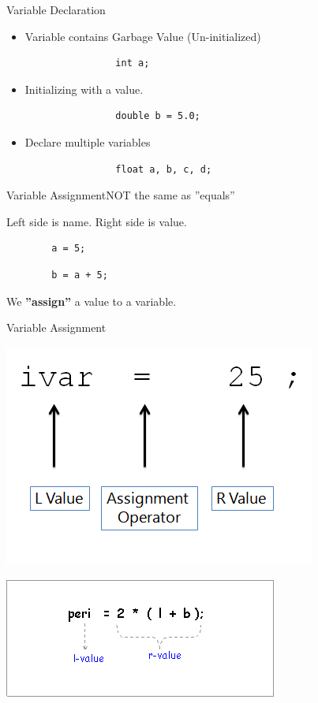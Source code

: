 \begin{frame}[fragile]{Variable Declaration}{}
    \begin{itemize}
        \item Variable contains Garbage Value (Un-initialized)
            \begin{verbatim}
                int a;
            \end{verbatim}
    \pause
        \item Initializing with a value.
            \begin{verbatim}
                double b = 5.0;
            \end{verbatim}
    \pause
        \item Declare multiple variables
            \begin{verbatim}
                float a, b, c, d;
            \end{verbatim}
    \end{itemize}
\end{frame}

\begin{frame}[fragile]{Variable Assignment}{NOT the same as ''equals''}
    \begin{block}{} Left side is name. Right side is value. \end{block}
    {
    \Huge \begin{verbatim}
        a = 5;
    \end{verbatim}
    \begin{verbatim}
        b = a + 5;
    \end{verbatim}
    }
    \begin{block}{} We \textbf{''assign''} a value to a variable. \end{block}
\end{frame}

\begin{frame}[fragile]{Variable Assignment}{}
    \begin{center}
        \includegraphics[height=0.4\textheight]{images/ass1.png}
    \end{center}
    \begin{center}
        \includegraphics[height=0.4\textheight]{images/ass2.png}
    \end{center}
\end{frame}
